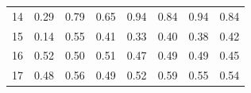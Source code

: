 \documentclass[twoside,11pt]{article}
\begin{document}
\begin{table}[H]
{\begin{tabular}{cccccccc}
\multicolumn{1}{|c|}{14}    & \multicolumn{1}{c|}{0.29}                                                           & \multicolumn{1}{c|}{0.79}                                                                                     & \multicolumn{1}{c|}{0.65}                                                                               & \multicolumn{1}{c|}{\cellcolor[HTML]{FFCCC9}0.94}                                                       & \multicolumn{1}{c|}{\cellcolor[HTML]{ECF4FF}0.84}                                                       & \multicolumn{1}{c|}{\cellcolor[HTML]{FFCCC9}0.94}                                                          & \multicolumn{1}{c|}{\cellcolor[HTML]{ECF4FF}0.84}                                                          \\ \cline{1-1}
\multicolumn{1}{|c|}{15}    & \multicolumn{1}{c|}{0.14}                                                           & \multicolumn{1}{c|}{\cellcolor[HTML]{FFCCC9}0.55}                                                             & \multicolumn{1}{c|}{0.41}                                                                               & \multicolumn{1}{c|}{0.33}                                                                               & \multicolumn{1}{c|}{0.40}                                                                               & \multicolumn{1}{c|}{0.38}                                                                                  & \multicolumn{1}{c|}{\cellcolor[HTML]{ECF4FF}0.42}                                                          \\ \cline{1-1}
\multicolumn{1}{|c|}{16}    & \multicolumn{1}{c|}{0.52}                                                           & \multicolumn{1}{c|}{\cellcolor[HTML]{ECF4FF}0.50}                                                             & \multicolumn{1}{c|}{\cellcolor[HTML]{FFCCC9}0.51}                                                       & \multicolumn{1}{c|}{0.47}                                                                               & \multicolumn{1}{c|}{0.49}                                                                               & \multicolumn{1}{c|}{0.49}                                                                                  & \multicolumn{1}{c|}{0.45}                                                                                  \\ \cline{1-1}
\multicolumn{1}{|c|}{17}    & \multicolumn{1}{c|}{0.48}                                                           & \multicolumn{1}{c|}{\cellcolor[HTML]{ECF4FF}0.56}                                                             & \multicolumn{1}{c|}{0.49}                                                                               & \multicolumn{1}{c|}{0.52}                                                                               & \multicolumn{1}{c|}{\cellcolor[HTML]{FFCCC9}0.59}                                                       & \multicolumn{1}{c|}{0.55}                                                                                  & \multicolumn{1}{c|}{0.54}                                                                                  \\ \cline{1-1}

\end{tabular}}
\end{table}
\end{document}
